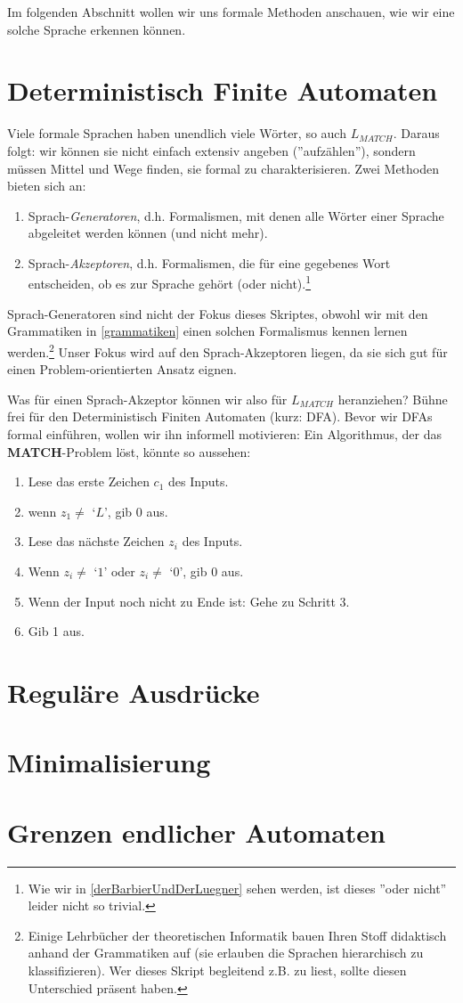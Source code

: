 Im folgenden Abschnitt wollen wir uns formale Methoden anschauen,
wie wir eine solche Sprache erkennen können.

\section{Deterministisch Finite Automaten}
Viele formale Sprachen haben unendlich viele Wörter,
so auch $L_{MATCH}$.
Daraus folgt: wir können sie nicht einfach extensiv angeben (''aufzählen''),
sondern müssen Mittel und Wege finden, sie formal zu charakterisieren.
Zwei Methoden bieten sich an:
\begin{enumerate}
    \item Sprach-\emph{Generatoren}, d.h. Formalismen,
        mit denen alle Wörter einer Sprache abgeleitet werden können
        (und nicht mehr).
    \item Sprach-\emph{Akzeptoren}, d.h. Formalismen,
        die für eine gegebenes Wort entscheiden,
        ob es zur Sprache gehört (oder nicht).\footnote{
            Wie wir in \autoref{derBarbierUndDerLuegner} sehen werden,
            ist dieses ''oder nicht'' leider nicht so trivial.}
\end{enumerate}

Sprach-Generatoren sind nicht der Fokus dieses Skriptes, obwohl wir mit den Grammatiken
in \autoref{grammatiken} einen solchen Formalismus kennen lernen werden.\footnote{
Einige Lehrbücher der theoretischen Informatik bauen Ihren Stoff didaktisch anhand der Grammatiken
auf (sie erlauben die Sprachen hierarchisch zu klassifizieren).
Wer dieses Skript begleitend z.B. zu \cite{schoening} liest,
sollte diesen Unterschied präsent haben.}
Unser Fokus wird auf den Sprach-Akzeptoren liegen,
da sie sich gut für einen Problem-orientierten Ansatz eignen.

Was für einen Sprach-Akzeptor können wir also für $L_{MATCH}$ heranziehen?
Bühne frei für den Deterministisch Finiten Automaten (kurz: DFA).
Bevor wir DFAs formal einführen, wollen wir ihn informell motivieren: 
Ein Algorithmus, der das \textbf{MATCH}-Problem löst, könnte so aussehen:
\begin{enumerate}
    \item Lese das erste Zeichen $c_1$ des Inputs.
    \item wenn $z_1 \neq $ `$L$', gib 0 aus.
    \item Lese das nächste Zeichen $z_i$ des Inputs.
    \item Wenn $z_i \neq $ `$1$' oder $z_i \neq $ `$0$', gib 0 aus.
    \item Wenn der Input noch nicht zu Ende ist: Gehe zu Schritt 3.
    \item Gib 1 aus.
\end{enumerate}

\section{Reguläre Ausdrücke}
\section{Minimalisierung}
\section{Grenzen endlicher Automaten}\label{pumping}
